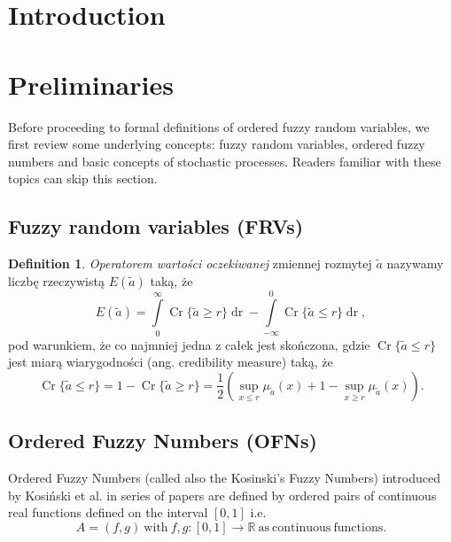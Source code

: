 \documentclass[review]{elsarticle}
\theoremstyle{definition}
\newtheorem{definition}{Definition}
\theoremstyle{theorem}
\DeclareMathOperator*{\Cr}{Cr}
\DeclareMathOperator*{\dr}{dr}
\begin{document}
\section{Introduction}



\section{Preliminaries}
Before proceeding to formal definitions of ordered fuzzy random variables, we first review some underlying concepts: fuzzy random variables, ordered fuzzy numbers and basic concepts of stochastic processes. Readers familiar with these topics can skip this section.

\subsection{Fuzzy random variables (FRVs)}
\label{sec:frv}


\begin{definition}
\label{def:owo}
{\it Operatorem wartości oczekiwanej} zmiennej rozmytej $\tilde{a}$ nazywamy liczbę rzeczywistą $E(\tilde{a})$ taką, że
\begin{equation}
E(\tilde{a})=\int\limits_0^{\infty}\Cr\{\tilde{a}\geq r\}\dr - \int\limits_{-\infty}^0\Cr\{\tilde{a}\leq r\}\dr,
\end{equation}
pod warunkiem, że co najmniej jedna z całek jest skończona, gdzie $\Cr\{\tilde{a}\leq r\}$ jest miarą wiarygodności (ang. credibility measure) taką, że
\begin{equation}
\label{eq:cr}
\Cr\{\tilde{a}\leq r\}=1-\Cr\{\tilde{a}\geq r\} = \frac{1}{2}\left(\sup\limits_{x\leq r}\mu_{\tilde{a}}(x) + 1 - \sup\limits_{x\geq r}\mu_{\tilde{a}}(x)\right).
\end{equation}
\end{definition}   

\subsection{Ordered Fuzzy Numbers (OFNs)}
Ordered Fuzzy Numbers (called also the Kosinski's Fuzzy Numbers) introduced by Kosi\'nski et al. in series of papers \cite{kos2002,kos2003a,kos2003b,kos2004,kos2006} are defined by ordered pairs of continuous real functions defined on the interval $[0,1]$ i.e.
\begin{equation}
A=(f,g)\ \mathrm{with}\ f,g\colon[0,1]\to\mathbb{R}\ \mathrm{as\ continuous\ functions}. 
\end{equation} 
\end{document}

